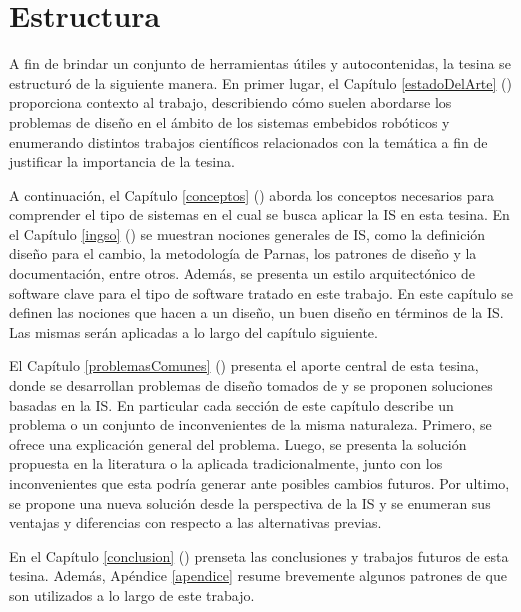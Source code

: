 \section*{Estructura}

A fin de brindar un conjunto de herramientas útiles y autocontenidas, la tesina se estructuró de la siguiente manera. En primer lugar, el Capítulo \ref{estadoDelArte} () proporciona contexto al trabajo, describiendo cómo suelen abordarse los problemas de diseño en el ámbito de los sistemas embebidos robóticos y enumerando distintos trabajos científicos relacionados con la temática a fin de justificar la importancia de la tesina.

A continuación, el Capítulo \ref{conceptos} () aborda los conceptos necesarios para comprender el tipo de sistemas en el cual se busca aplicar la IS en esta tesina. En el Capítulo \ref{ingso} () se muestran nociones generales de IS, como la definición diseño para el cambio, la metodología de Parnas, los patrones de diseño y la documentación, entre otros. Además, se presenta un estilo arquitectónico de software clave para el tipo de software tratado en este trabajo. En este capítulo se definen las nociones que hacen a un diseño, un buen diseño en términos de la IS. Las mismas serán aplicadas a lo largo del capítulo siguiente.

El Capítulo \ref{problemasComunes} () presenta el aporte central de esta tesina, donde se desarrollan problemas de diseño tomados de \cite{douglass} y se proponen soluciones basadas en la \gls{IS}. En particular cada sección de este capítulo describe un problema o un conjunto de inconvenientes de la misma naturaleza. Primero, se ofrece una explicación general del problema. Luego, se presenta la solución propuesta en la literatura o la aplicada tradicionalmente, junto con los inconvenientes que esta podría generar ante posibles cambios futuros. Por ultimo, se propone una nueva solución desde la perspectiva de la IS y se enumeran sus ventajas y diferencias con respecto a las alternativas previas.

En el Capítulo \ref{conclusion} () prenseta las conclusiones y trabajos futuros de esta tesina. Además, Apéndice \ref{apendice} resume brevemente algunos patrones de \cite{Gamma:1995:DPE:186897} que son utilizados a lo largo de este trabajo.


